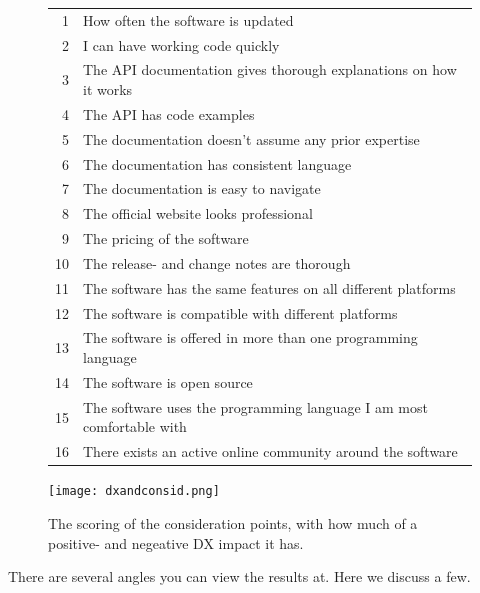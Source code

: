 \documentclass{cslthse-msc}
\begin{document}
    \begin{figure}[H]
        \centering
        \begin{tabular}{r l}
            \hline
            1    & How often the software is updated    \\
            2    & I can have working code quickly  \\
            3    & The API documentation gives thorough explanations on how it works    \\
            4    & The API has code examples    \\
            5    & The documentation doesn't assume any prior expertise \\
            6    & The documentation has consistent language    \\
            7    & The documentation is easy to navigate    \\
            8    & The official website looks professional  \\
            9    & The pricing of the software  \\
            10    &  The release- and change notes are thorough \\
            11   &  The software has the same features on all different platforms   \\
            12    &  The software is compatible with different platforms    \\
            13  &  The software is offered in more than one programming language    \\
            14    &  The software is open source    \\
            15    &  The software uses the programming language I am most comfortable with  \\
            16    &  There exists an active online community around the software    \\ \hline
        \end{tabular}
        \hspace*{-0.01\textwidth}\texttt{[image: dxandconsid.png]}
        \caption{The scoring of the consideration points, with how much of a positive- and negeative DX impact it has.}
        \label{fig:dxandcosnid}
    \end{figure}

    There are several angles you can view the results at. Here we discuss a few.
\end{document}
